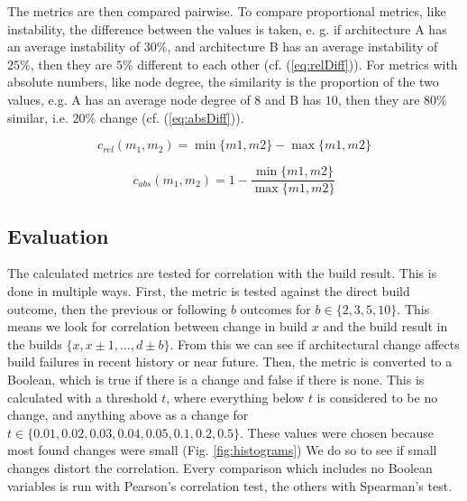 \documentclass[conference]{IEEEtran}
\begin{document}
The metrics are then compared pairwise. To compare proportional metrics, like instability, the difference between the values is taken, e. g. if architecture A has an average instability of $30\%$, and architecture B has an average instability of $25\%$, then they are $5\%$ different to each other (cf. (\ref{eq:relDiff})). For metrics with absolute numbers, like node degree, the similarity is the proportion of the two values, e.g. A has an average node degree of $8$ and B has $10$, then they are $80\%$ similar, i.e. $20\%$ change (cf. (\ref{eq:absDiff})).

\begin{equation} \label{eq:relDiff}
c_{rel}(m_1, m_2) =  \min\{m1, m2\} - \max\{m1, m2\}
\end{equation} 

\begin{equation} \label{eq:absDiff}
	c_{abs}(m_1, m_2) = 1 - \frac{\min\{m1, m2\}}{\max\{m1, m2\}}
\end{equation} 

\subsection{Evaluation}

The calculated metrics are tested for correlation with the build result. This is done in multiple ways. First, the metric is tested against the direct build outcome, then the previous or following $b$ outcomes for $b \in \{2, 3, 5, 10\}$. This means we look for correlation between change in build $x$ and the build result in the builds $\{x, x \pm 1, \hdots, d \pm b\}$. From this we can see if architectural change affects build failures in recent history or near future. 
Then, the metric is converted to a Boolean, which is true if there is a change and false if there is none. This is calculated with a threshold $t$, where everything below $t$ is considered to be no change, and anything above as a change for $t \in \{0.01, 0.02, 0.03, 0.04, 0.05, 0.1, 0.2, 0.5\}$. These values were chosen because most found changes were small (Fig. \ref{fig:histograms}) We do so to see if small changes distort the correlation. Every comparison which includes no Boolean variables is run with Pearson's correlation test, the others with Spearman's test. 
\end{document}
